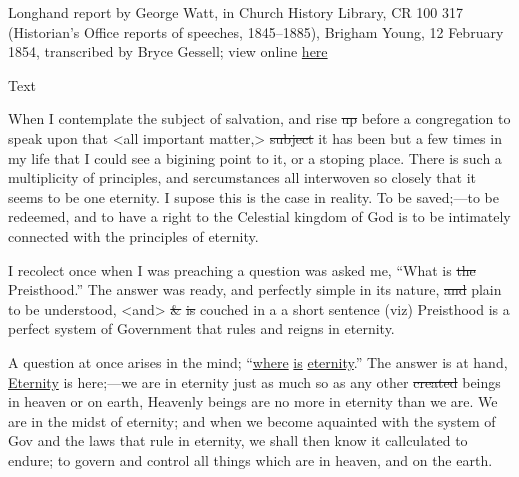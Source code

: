 					Longhand report by George Watt, in Church History Library, CR 100 317 (Historian's Office reports of speeches, 1845--1885), Brigham Young, 12 February 1854, transcribed by Bryce Gessell; view online \href{https://catalog.churchofjesuschrist.org/assets/1e4f947a-0644-47b0-b058-5dd134a82a00/0/0}{here}
				
				\begin{description}
					\item[Text]
				\end{description}
				
					When I contemplate the subject of salvation, and rise \sout{up} before a congregation to speak upon that <all important matter,> \sout{subject} it has been but a few times in my life that I could see a bigining point to it, or a stoping place. There is such a multiplicity of principles, and sercumstances all interwoven so closely that it seems to be one eternity. I supose this is the case in reality. To be saved;---to be redeemed, and to have a right to the Celestial kingdom of God is to be intimately connected with the principles of eternity.
		
					I recolect once when I was preaching a question was asked me, ``What is \sout{the} Preisthood.'' The answer was ready, and perfectly simple in its nature, \sout{and} plain to be understood, <and> \sout{\&} \sout{is} couched in a a short sentence (viz) Preisthood is a perfect system of Government that rules and reigns in eternity.
					
					A question at once arises in the mind; ``\uline{where} \uline{is} \uline{eternity}.'' The answer is at hand, \uline{Eternity} is here;---we are in eternity just as much so as any other \sout{created} beings in heaven or on earth, Heavenly beings are no more in eternity than we are. We are in the midst of eternity; and when we become aquainted with the system of Gov and the laws that rule in eternity, we shall then know it callculated to endure; to govern and control all things which are in heaven, and on the earth.
					
